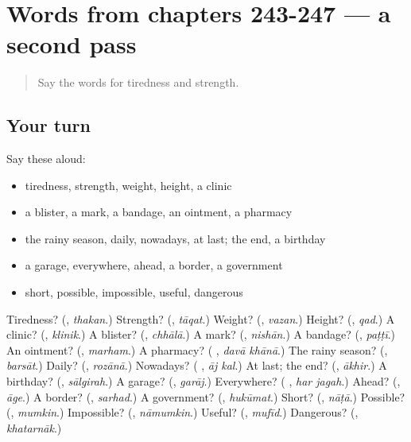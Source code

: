 \section[(dialogue)]{Words from chapters 243-247 — a second pass}

\label{lesson:UR-R247-second-pass-words-from-chapters-243-247}



\begin{quote}
Say the words for tiredness and strength.
\end{quote}

\subsection*{Your turn}
Say these aloud:

\begin{itemize}
\raggedright
  \item tiredness, strength, weight, height, a clinic
  \item a blister, a mark, a bandage, an ointment, a pharmacy
  \item the rainy season, daily, nowadays, at last; the end, a birthday
  \item a garage, everywhere, ahead, a border, a government
  \item short, possible, impossible, useful, dangerous
\end{itemize}

\begin{tcolorbox}[breakable,colback=teal!4,colframe=teal!35!black,title={Before you move on}]
Tiredness? (\textbf{}, \emph{thakan}.) Strength? (\textbf{}, \emph{tāqat}.) Weight? (\textbf{}, \emph{vazan}.) Height? (\textbf{}, \emph{qad}.) A clinic? (\textbf{}, \emph{klinik}.) A blister? (\textbf{}, \emph{chhālā}.) A mark? (\textbf{}, \emph{nishān}.) A bandage? (\textbf{}, \emph{paṭṭī}.) An ointment? (\textbf{}, \emph{marham}.) A pharmacy? (\textbf{ }, \emph{davā khānā}.) The rainy season? (\textbf{}, \emph{barsāt}.) Daily? (\textbf{}, \emph{rozānā}.) Nowadays? (\textbf{ }, \emph{āj kal}.) At last; the end? (\textbf{}, \emph{ākhir}.) A birthday? (\textbf{}, \emph{sālgirah}.) A garage? (\textbf{}, \emph{garāj}.) Everywhere? (\textbf{ }, \emph{har jagah}.) Ahead? (\textbf{}, \emph{āge}.) A border? (\textbf{}, \emph{sarhad}.) A government? (\textbf{}, \emph{hukūmat}.) Short? (\textbf{}, \emph{nāṭā}.) Possible? (\textbf{}, \emph{mumkin}.) Impossible? (\textbf{}, \emph{nāmumkin}.) Useful? (\textbf{}, \emph{mufīd}.) Dangerous? (\textbf{}, \emph{khatarnāk}.)
\end{tcolorbox}
